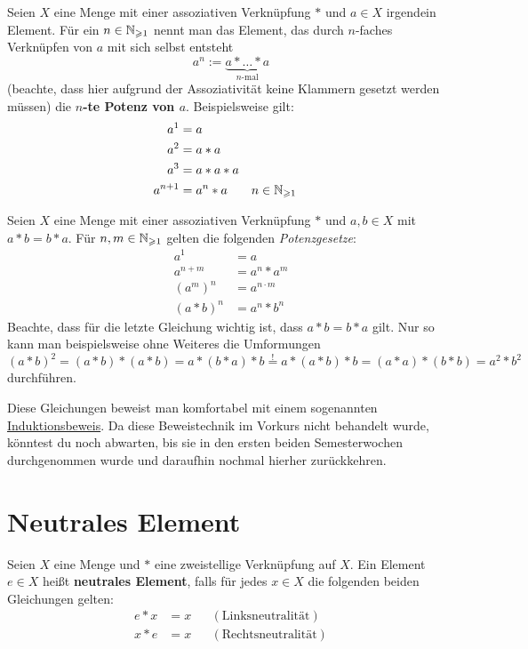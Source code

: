  
 
 \begin{de}[Potenzen]
  Seien $X$ eine Menge mit einer assoziativen Verknüpfung $*$ und $a\in X$ irgendein Element. Für ein $n\in {\mathbb N}_{\geqslant 1}$ nennt man das Element, das durch $n$-faches Verknüpfen von $a$ mit sich selbst entsteht
  \[ a^n := \underbrace{a * \ldots * a}_{n\text{-mal}} \]
  (beachte, dass hier aufgrund der Assoziativität keine Klammern gesetzt werden müssen) die \textbf{$n$-te Potenz von $a$}. Beispielsweise gilt:
  \begin{align*}
   a^1 & = a \\
   a^2 & = a* a \\
   a^3 & = a*a*a \\
   a^{n+1} & = a^n*a && n\in {\mathbb N}_{\geqslant 1}
  \end{align*}
 \end{de}
 
 
 
 \begin{bem}\label{potlaw}
    Seien $X$ eine Menge mit einer assoziativen Verknüpfung $*$ und $a,b\in X$ mit $a*b=b*a$. Für $n,m\in {\mathbb N}_{\geqslant 1}$ gelten die folgenden \emph{Potenzgesetze}:
    \begin{align*}
    a^1 & = a \\
     a^{n+m} & = a^n* a^m \\
     (a^m)^n & = a^{n\cdot m} \\
    (a*b)^n &= a^n*b^n
    \end{align*}
Beachte, dass für die letzte Gleichung wichtig ist, dass $a*b=b*a$ gilt. Nur so kann man beispielsweise ohne Weiteres die Umformungen
\[ (a*b)^2 = (a*b)*(a*b) = a*(b*a)*b \overset{!}{=} a*(a*b)*b = (a*a)*(b*b) = a^2*b^2 \] 
durchführen.
 \end{bem}
\begin{bew}
 Diese Gleichungen beweist man komfortabel mit einem sogenannten \href{https://de.wikipedia.org/wiki/Vollst%C3%A4ndige_Induktion}{Induktionsbeweis}. Da diese Beweistechnik im Vorkurs nicht behandelt wurde, könntest du noch abwarten, bis sie in den ersten beiden Semesterwochen durchgenommen wurde und daraufhin nochmal hierher zurückkehren.
\end{bew}



 
 \section{Neutrales Element}


\begin{de} \label{neutrales}
Seien $X$ eine Menge und $*$ eine zweistellige Verknüpfung auf $X$. Ein Element $e\in X$ heißt \textbf{neutrales Element}, falls für jedes $x\in X$ die folgenden beiden Gleichungen gelten:
\begin{align*}
 e*x & = x && (\text{Linksneutralität}) \\
 x*e & = x && (\text{Rechtsneutralität})
\end{align*}
\end{de}




